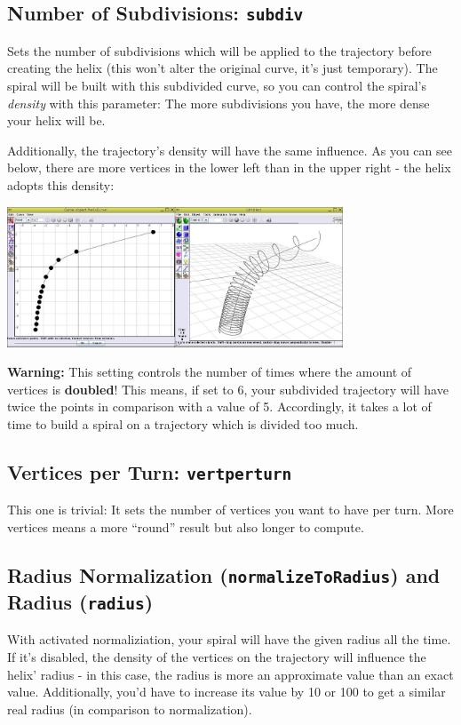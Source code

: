 \documentclass[12pt,a4paper]{scrartcl}
\begin{document}
\subsection{Number of Subdivisions: \texttt{subdiv}}
Sets the number of subdivisions which will be applied to the trajectory
before creating the helix (this won't alter the original curve, it's
just temporary). The spiral will be built with this subdivided curve,
so you can control the spiral's \emph{density} with this parameter:
The more subdivisions you have, the more dense your helix will be.

Additionally, the trajectory's density will have the same influence.
As you can see below, there are more vertices in the lower left than
in the upper right - the helix adopts this density:
\begin{center}
	\includegraphics[width=0.75\textwidth]{../pics/dichte-comp-1.jpg}
\end{center}

\textbf{Warning:} This setting controls the number of times where the
amount of vertices is \textbf{doubled}! This means, if set to 6, your
subdivided trajectory will have twice the points in comparison with a
value of 5. Accordingly, it takes a lot of time to build a spiral on
a trajectory which is divided too much.

\subsection{Vertices per Turn: \texttt{vertperturn}}
This one is trivial: It sets the number of vertices you want to have
per turn. More vertices means a more ``round'' result but also longer
to compute.

\subsection{Radius Normalization (\texttt{normalizeToRadius}) and Radius (\texttt{radius})}
With activated normaliziation, your spiral will have the given radius
all the time. If it's disabled, the density of the vertices on the
trajectory will influence the helix' radius - in this case, the radius
is more an approximate value than an exact value. Additionally, you'd
have to increase its value by 10 or 100 to get a similar real radius
(in comparison to normalization).
\end{document}
